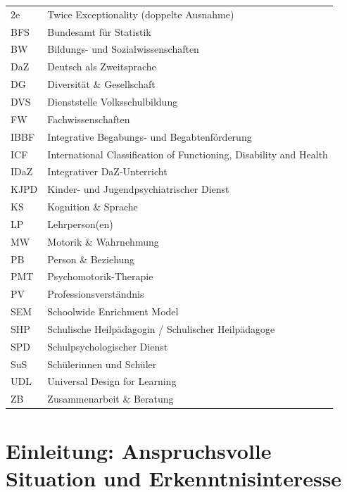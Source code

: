 \documentclass[ngerman, a4paper]{article}
\begin{document}
\begin{tabular}{@{}ll@{}}
2e    & Twice Exceptionality (doppelte Ausnahme) \\
BFS   & Bundesamt für Statistik \\
BW    & Bildungs- und Sozialwissenschaften \\
DaZ   & Deutsch als Zweitsprache \\
DG    & Diversität \& Gesellschaft \\
DVS   & Dienststelle Volksschulbildung \\
FW    & Fachwissenschaften \\
IBBF  & Integrative Begabungs- und Begabtenförderung \\
ICF   & International Classification of Functioning, Disability and Health \\
IDaZ  & Integrativer DaZ-Unterricht \\
KJPD  & Kinder- und Jugendpsychiatrischer Dienst \\
KS    & Kognition \& Sprache \\
LP    & Lehrperson(en) \\
MW    & Motorik \& Wahrnehmung \\
PB    & Person \& Beziehung \\
PMT   & Psychomotorik-Therapie \\
PV    & Professionsverständnis \\
SEM   & Schoolwide Enrichment Model \\
SHP   & Schulische Heilpädagogin / Schulischer Heilpädagoge \\
SPD   & Schulpsychologischer Dienst \\
SuS   & Schülerinnen und Schüler \\
UDL   & Universal Design for Learning \\
ZB    & Zusammenarbeit \& Beratung \\
\end{tabular}


\newpage
{}
\renewcommand{\thepage}{\arabic{page}}

\cleardoublepage{}
{}
\section*{Einleitung: Anspruchsvolle Situation und Erkenntnisinteresse}
\label{sec:einleitung}
 
\end{document}
